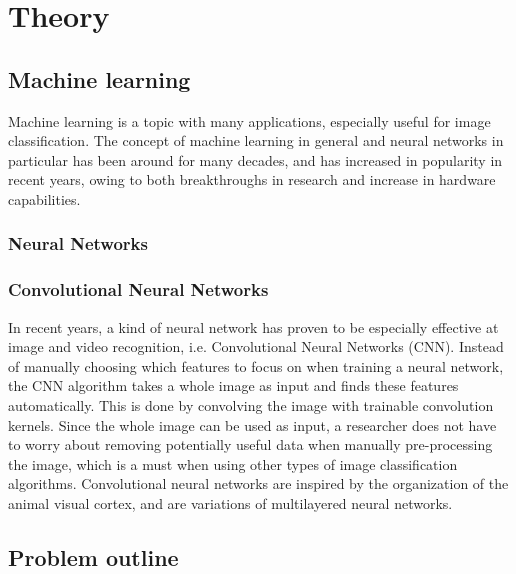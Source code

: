 \chapter{Theory}\label{cha:intro}

\section{Machine learning}\label{sec:research:history}
Machine learning is a topic with many applications, especially useful for image classification. The concept of machine learning in general and neural networks in particular has been around for many decades, and has increased in popularity in recent years, owing to both breakthroughs in research and increase in hardware capabilities.
\subsection{Neural Networks}\label{sec:research:history}
\subsection{Convolutional Neural Networks}\label{sec:research:history}
In recent years, a kind of neural network has proven to be especially effective at image and video recognition, i.e. Convolutional Neural Networks (CNN). Instead of manually choosing which features to focus on when training a neural network, the CNN algorithm takes a whole image as input and finds these features automatically. This is done by convolving the image with trainable convolution kernels. Since the whole image can be used as input, a researcher does not have to worry about removing potentially useful data when manually pre-processing the image, which is a must when using other types of image classification algorithms.
Convolutional neural networks are inspired by the organization of the animal visual cortex, and are variations of multilayered neural networks.

\section{Problem outline}\label{sec:research:history}
